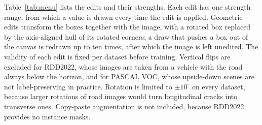 \documentclass[conference]{IEEEtran}
\begin{document}
Table~\ref{tab:menu} lists the edits and their strengths. Each edit has one strength range, from which a value is drawn every time the edit is applied. Geometric edits transform the boxes together with the image, with a rotated box replaced by the axis-aligned hull of its rotated corners; a draw that pushes a box out of the canvas is redrawn up to ten times, after which the image is left unedited. The validity of each edit is fixed per dataset before training. Vertical flips are excluded for RDD2022, whose images are taken from a vehicle with the road always below the horizon, and for PASCAL VOC, whose upside-down scenes are not label-preserving in practice. Rotation is limited to $\pm10^\circ$ on every dataset, because larger rotations of road images would turn longitudinal cracks into transverse ones. Copy-paste augmentation is not included, because RDD2022 provides no instance masks.
\end{document}
